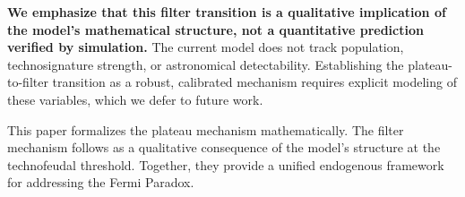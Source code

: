 \textbf{We emphasize that this filter transition is a qualitative implication of the model's mathematical structure, not a quantitative prediction verified by simulation.} The current model does not track population, technosignature strength, or astronomical detectability. Establishing the plateau-to-filter transition as a robust, calibrated mechanism requires explicit modeling of these variables, which we defer to future work.

This paper formalizes the plateau mechanism mathematically. The filter mechanism follows as a qualitative consequence of the model's structure at the technofeudal threshold. Together, they provide a unified endogenous framework for addressing the Fermi Paradox.
